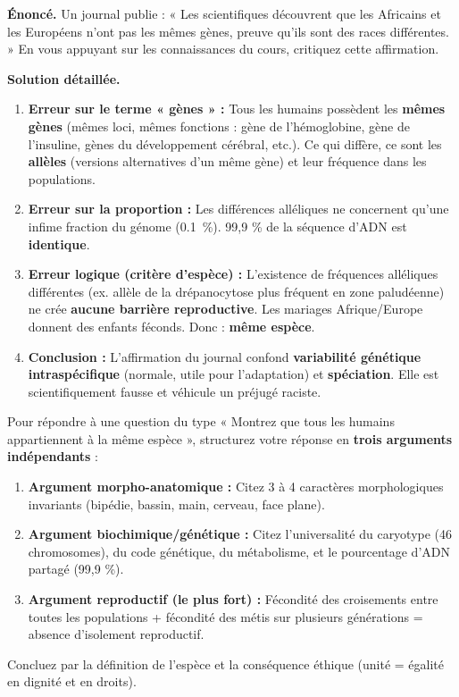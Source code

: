 \documentclass[11pt]{article}
\begin{document}
\begin{exoresolu}
\textbf{Énoncé.} Un journal publie : « Les scientifiques découvrent que les Africains et les Européens n'ont pas les mêmes gènes, preuve qu'ils sont des races différentes. » En vous appuyant sur les connaissances du cours, critiquez cette affirmation.

\textbf{Solution détaillée.}
\begin{enumerate}
    \item \textbf{Erreur sur le terme « gènes » :} Tous les humains possèdent les \textbf{mêmes gènes} (mêmes loci, mêmes fonctions : gène de l'hémoglobine, gène de l'insuline, gènes du développement cérébral, etc.). Ce qui diffère, ce sont les \textbf{allèles} (versions alternatives d'un même gène) et leur fréquence dans les populations.
    \item \textbf{Erreur sur la proportion :} Les différences alléliques ne concernent qu'une infime fraction du génome (\SI{0,1}{\%}). 99,9 \% de la séquence d'ADN est \textbf{identique}.
    \item \textbf{Erreur logique (critère d'espèce) :} L'existence de fréquences alléliques différentes (ex. allèle de la drépanocytose plus fréquent en zone paludéenne) ne crée \textbf{aucune barrière reproductive}. Les mariages Afrique/Europe donnent des enfants féconds. Donc : \textbf{même espèce}.
    \item \textbf{Conclusion :} L'affirmation du journal confond \textbf{variabilité génétique intraspécifique} (normale, utile pour l'adaptation) et \textbf{spéciation}. Elle est scientifiquement fausse et véhicule un préjugé raciste.
\end{enumerate}
\end{exoresolu}

\begin{methode}
Pour répondre à une question du type « Montrez que tous les humains appartiennent à la même espèce », structurez votre réponse en \textbf{trois arguments indépendants} :
\begin{enumerate}
    \item \textbf{Argument morpho-anatomique :} Citez 3 à 4 caractères morphologiques invariants (bipédie, bassin, main, cerveau, face plane).
    \item \textbf{Argument biochimique/génétique :} Citez l'universalité du caryotype (46 chromosomes), du code génétique, du métabolisme, et le pourcentage d'ADN partagé (99,9 \%).
    \item \textbf{Argument reproductif (le plus fort) :} Fécondité des croisements entre toutes les populations + fécondité des métis sur plusieurs générations = absence d'isolement reproductif.
\end{enumerate}
Concluez par la définition de l'espèce et la conséquence éthique (unité = égalité en dignité et en droits).
\end{methode}
\end{document}
